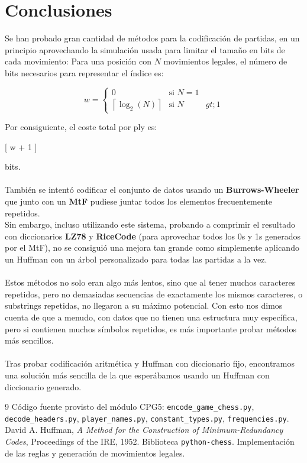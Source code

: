 \documentclass[11pt, letterpaper]{article}
\begin{document}
\section{Conclusiones}



Se han probado gran cantidad de métodos para la codificación de partidas, en un principio aprovechando la simulación usada para limitar el tamaño en bits de cada movimiento:
Para una posición con $N$ movimientos legales, el número de bits necesarios para representar el índice es:

\[
w =
\begin{cases}
0 & \text{si } N=1 \\
\left\lceil \log_2(N) \right\rceil & \text{si } N&gt;1
\end{cases}
\]

Por consiguiente, el coste total por ply es:

[
w + 1
]

bits.
\\\\
También se intentó codificar el conjunto de datos usando un \textbf{Burrows-Wheeler} que junto con un \textbf{MtF} pudiese juntar todos los elementos frecuentemente repetidos.
\\
Sin embargo, incluso utilizando este sistema, probando a comprimir el resultado con diccionarios \textbf{LZ78} y \textbf{RiceCode} (para aprovechar todos los 0s y 1s generados por el MtF), no se consiguió una mejora tan grande como simplemente aplicando un Huffman con un árbol personalizado para todas las partidas a la vez.
\\\\
Estos métodos no solo eran algo más lentos, sino que al tener muchos caracteres repetidos, pero no demasiadas secuencias de exactamente los mismos caracteres, o substrings repetidas, no llegaron a su máximo potencial.
Con esto nos dimos cuenta de que a menudo, con datos que no tienen una estructura muy específica, pero si contienen muchos símbolos repetidos, es más importante probar métodos más sencillos.
\\\\
Tras probar codificación aritmética y Huffman con diccionario fijo, encontramos una solución más sencilla de la que esperábamos usando un Huffman con diccionario generado. 


\newpage
{}
\begin{thebibliography}{9}
    Código fuente provisto del módulo CPG5: \texttt{encode\_game\_chess.py}, \texttt{decode\_headers.py}, \texttt{player\_names.py}, \texttt{constant\_types.py}, \texttt{frequencies.py}.
    David A. Huffman, \textit{A Method for the Construction of Minimum-Redundancy Codes}, Proceedings of the IRE, 1952.
    Biblioteca \texttt{python-chess}. Implementación de las reglas y generación de movimientos legales.
\end{thebibliography}
\end{document}
